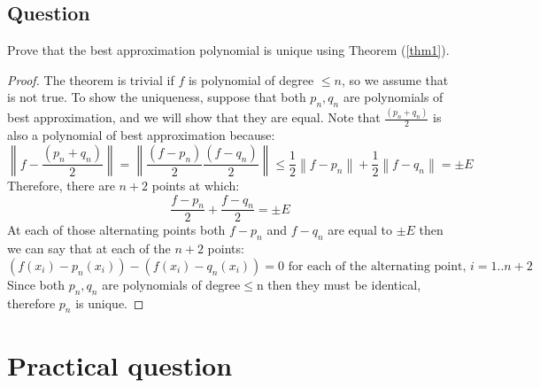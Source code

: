 \documentclass[]{article}
\newcommand{\norm}[1]{\left\lVert#1\right\rVert}
\begin{document}
\subsection{Question}
Prove that the best approximation polynomial is unique using Theorem (\ref{thm1}). 
\begin{proof}
	The theorem is trivial if $f$ is polynomial of degree $\leq n$, so we assume that is not true. To show the uniqueness, suppose that both $p_n, q_n$ are polynomials of best approximation, and we will show that they are equal.
	Note that $\frac{(p_n + q_n)}{2}$ is also a polynomial of best approximation because:
	\begin{equation*}
		 \norm{f-\frac{(p_n + q_n)}{2}} = \norm{\frac{(f - p_n)}{2} \frac{(f - q_n)}{2}} \leq \frac{1}{2}\norm{f-p_n} + 
		 \frac{1}{2}\norm{f-q_n} = \pm E
	\end{equation*}
	Therefore, there are $n+2$ points at which:
	\begin{equation*}
		\frac{f-p_n}{2}+\frac{f-q_n}{2}=\pm E
	\end{equation*}
	At each of those alternating points both $f-p_n$ and $f-q_n$ are equal to $\pm E$ then we can say that at each of the $n+2$ points:
	\begin{equation*}
		(f(x_i) - p_n(x_i)) - (f(x_i)-q_n(x_i)) = 0 \text{ for each of the alternating point, }i=1..n+2
	\end{equation*}
	Since both $p_n,q_n$ are polynomials of degree$\leq$n then they must be identical, therefore $p_n$ is unique.
\end{proof}

\section{Practical question}
\end{document}
